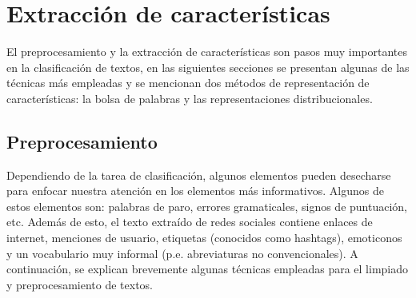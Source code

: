 \section{Extracción de características}
El preprocesamiento y la extracción de características son pasos muy importantes en la clasificación de textos, en las siguientes secciones se presentan algunas de las técnicas más empleadas y se mencionan dos métodos de representación de características: la bolsa de palabras y las representaciones distribucionales.

\subsection{Preprocesamiento}
Dependiendo de la tarea de clasificación, algunos elementos pueden desecharse para enfocar nuestra atención en los elementos más informativos. Algunos de estos elementos son: palabras de paro, errores gramaticales, signos de puntuación, etc. Además de esto, el texto extraído de redes sociales contiene enlaces de internet, menciones de usuario, etiquetas (conocidos como hashtags), emoticonos y un vocabulario muy informal (p.e. abreviaturas no convencionales). A continuación, se explican brevemente algunas técnicas empleadas para el limpiado y preprocesamiento de textos.

